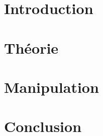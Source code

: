 \documentclass[a4paper,french,twoside,13pt]{report}
\begin{document}
\pagestyle{fancy}

\tableofcontents

\newpage

\section{Introduction}


\section{Théorie}


\newpage
\section{Manipulation}


\section{Conclusion}


\listoffigures
\begingroup
\let\clearpage\relax
\listoftables
\endgroup
\end{document}

